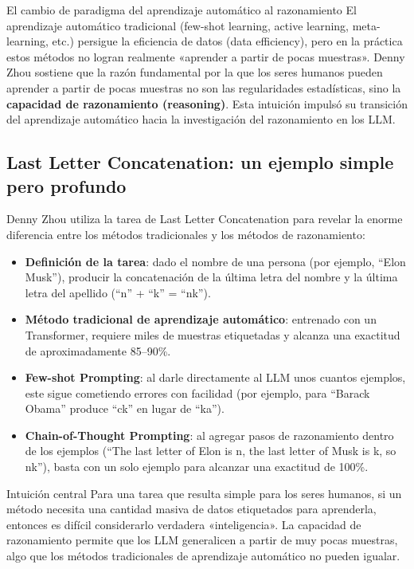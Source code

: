 \documentclass[a4paper]{article}
\begin{document}
\begin{knowledgebox}{El cambio de paradigma del aprendizaje automático al razonamiento}
El aprendizaje automático tradicional (few-shot learning, active learning, meta-learning, etc.) persigue la eficiencia de datos (data efficiency), pero en la práctica estos métodos no logran realmente «aprender a partir de pocas muestras». Denny Zhou sostiene que la razón fundamental por la que los seres humanos pueden aprender a partir de pocas muestras no son las regularidades estadísticas, sino la \textbf{capacidad de razonamiento (reasoning)}. Esta intuición impulsó su transición del aprendizaje automático hacia la investigación del razonamiento en los LLM.
\end{knowledgebox}

\subsection{Last Letter Concatenation: un ejemplo simple pero profundo}

Denny Zhou utiliza la tarea de Last Letter Concatenation para revelar la enorme diferencia entre los métodos tradicionales y los métodos de razonamiento:

\begin{itemize}
    \item \textbf{Definición de la tarea}: dado el nombre de una persona (por ejemplo, ``Elon Musk''), producir la concatenación de la última letra del nombre y la última letra del apellido (``n'' + ``k'' = ``nk'').
    \item \textbf{Método tradicional de aprendizaje automático}: entrenado con un Transformer, requiere miles de muestras etiquetadas y alcanza una exactitud de aproximadamente 85--90\%.
    \item \textbf{Few-shot Prompting}: al darle directamente al LLM unos cuantos ejemplos, este sigue cometiendo errores con facilidad (por ejemplo, para ``Barack Obama'' produce ``ck'' en lugar de ``ka'').
    \item \textbf{Chain-of-Thought Prompting}: al agregar pasos de razonamiento dentro de los ejemplos (``The last letter of Elon is n, the last letter of Musk is k, so nk''), basta con un solo ejemplo para alcanzar una exactitud de 100\%.
\end{itemize}

\begin{importantbox}{Intuición central}
Para una tarea que resulta simple para los seres humanos, si un método necesita una cantidad masiva de datos etiquetados para aprenderla, entonces es difícil considerarlo verdadera «inteligencia». La capacidad de razonamiento permite que los LLM generalicen a partir de muy pocas muestras, algo que los métodos tradicionales de aprendizaje automático no pueden igualar.
\end{importantbox}
\end{document}
